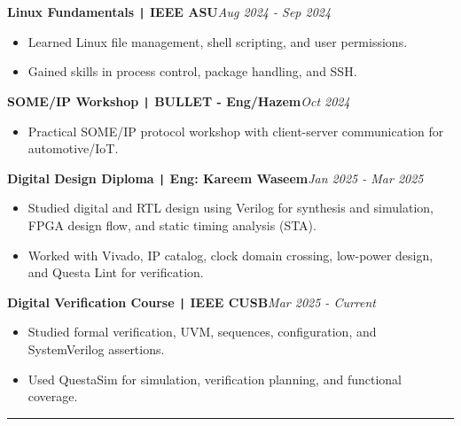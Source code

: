 \documentclass[11pt,a4paper]{article}
\begin{document}
\vspace{-0.5cm}
\begin{flushleft}
\textbf{Linux Fundamentals \texttt{|} IEEE ASU}\hfill\textit{Aug 2024 - Sep 2024}\\
\end{flushleft}
\vspace{-0.7cm}
\begin{itemize}
\item \setlength{\itemsep}{-0.0em} Learned Linux file management, shell scripting, and user permissions.
\item \setlength{\itemsep}{-0.0em} Gained skills in process control, package handling, and SSH.
\end{itemize}
\vspace{-0.5cm}
\begin{flushleft}
\textbf{SOME/IP Workshop \texttt{|} BULLET - Eng/Hazem}\hfill\textit{Oct 2024}\\
\end{flushleft}
\vspace{-0.7cm}
\begin{itemize}
\item \setlength{\itemsep}{-0.0em} Practical SOME/IP protocol workshop with client-server communication for automotive/IoT.
\end{itemize}
\vspace{-0.5cm}
\begin{flushleft}
\textbf{Digital Design Diploma \texttt{|} Eng: Kareem Waseem}\hfill\textit{Jan 2025 - Mar 2025}\\
\end{flushleft}
\vspace{-0.7cm}
\begin{itemize}
\item \setlength{\itemsep}{-0.0em} Studied digital and RTL design using Verilog for synthesis and simulation, FPGA design flow, and static timing analysis (STA).
\item \setlength{\itemsep}{-0.0em} Worked with Vivado, IP catalog, clock domain crossing, low-power design, and Questa Lint for verification.
\end{itemize}
\vspace{-0.5cm}
\begin{flushleft}
\textbf{Digital Verification Course \texttt{|} IEEE CUSB}\hfill\textit{Mar 2025 - Current}\\
\end{flushleft}
\vspace{-0.7cm}
\begin{itemize}
\item \setlength{\itemsep}{-0.0em} Studied formal verification, UVM, sequences, configuration, and SystemVerilog assertions.
\item \setlength{\itemsep}{-0.0em} Used QuestaSim for simulation, verification planning, and functional coverage.
\end{itemize}
\vspace{-0.5cm}
\vspace{-0.1cm}
\rule{\textwidth}{0.3pt}\\
\vspace{-0.5cm}
\centering
\end{document}
